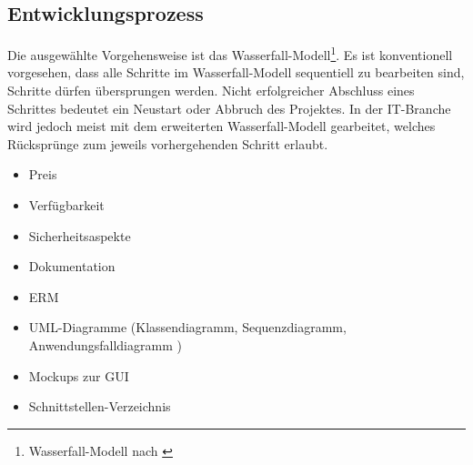 \subsection{Entwicklungsprozess}
\label{sec:Entwicklungsprozess}

Die ausgewählte Vorgehensweise ist das Wasserfall-Modell\footnote{Wasserfall-Modell nach \cite{wasserfallRoyce}}. Es ist konventionell vorgesehen, dass alle Schritte im Wasserfall-Modell sequentiell zu bearbeiten sind, \dahe Schritte dürfen übersprungen werden. Nicht erfolgreicher Abschluss eines Schrittes bedeutet ein Neustart oder Abbruch des Projektes. In der IT-Branche wird jedoch meist mit dem erweiterten Wasserfall-Modell gearbeitet, welches Rücksprünge zum jeweils vorhergehenden Schritt erlaubt. 

\begin{enumerate}
		\begin{itemize}
			\item Preis
			\item Verfügbarkeit
			\item Sicherheitsaspekte
			\item Dokumentation
		\end{itemize}
	
	

		\begin{itemize}
			\item \ac{ERM}
			\item \acs{UML}-Diagramme (Klassendiagramm, Sequenzdiagramm, Anwendungsfalldiagramm \usw)
			\item Mockups zur \acs{GUI}
			\item Schnittstellen-Verzeichnis
		\end{itemize}
	

\end{enumerate}
